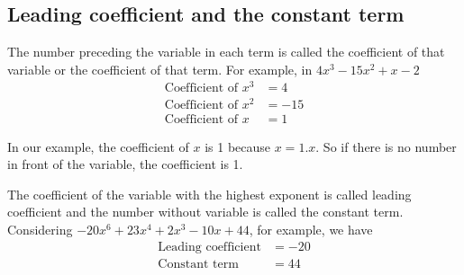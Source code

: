  \subsection{Leading coefficient and the constant term}
 The number preceding the variable in each term is called the coefficient of that variable or the coefficient of that term. For example, in $4x^3−15x^2+x−2$ 
 \begin{align*}
     \text{Coefficient of $x^3$} & = 4 \\
     \text{Coefficient of $x^2$} & = -15 \\
     \text{Coefficient of $x\ $} & = 1
 \end{align*}
 \begin{nt}
    In our example, the coefficient of $x$ is 1 because $x=1.x$. So if there is no number in front of the variable, the coefficient is 1.
 \end{nt}
 The coefficient of the variable with the highest exponent is called
 leading coefficient and the number without variable is called the constant term. Considering $-20x^6+23x^4+2x^3-10x+44$, for example, we have
 \begin{align*}
    \text{Leading coefficient} & = -20 \\
    \text{Constant term} &= 44
 \end{align*}
